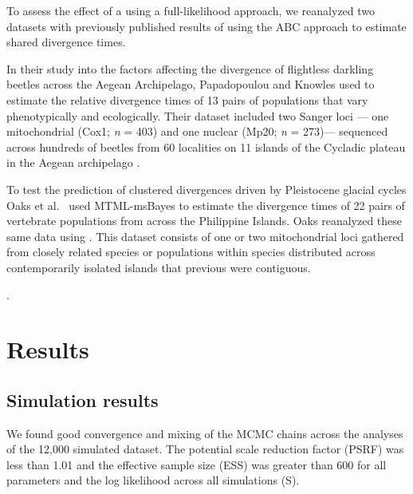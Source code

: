 \documentclass[letterpaper,12pt]{article}
\begin{document}
To assess the effect of a using a full-likelihood approach, we reanalyzed two
datasets with previously published results of using the ABC approach to
estimate shared divergence times.

In their study into the factors affecting the divergence of flightless darkling beetles across the Aegean Archipelago,
Papadopoulou and Knowles \citeyear{PapadopoulouKnowles2015} used \dppmsbayes to estimate the relative divergence times of 13 pairs of populations that vary phenotypically and ecologically.
Their dataset included two Sanger loci --- one mitochondrial (Cox1; \textit{n} = 403) and one nuclear (Mp20; \textit{n} = 273)--- sequenced across hundreds of beetles from 60 localities on 11 islands of the Cycladic plateau in the Aegean archipelago \citep{PapadopoulouKnowles2015}.

To test the prediction of clustered divergences driven by Pleistocene glacial
cycles Oaks et al.\ \citeyear{Oaks2012} used MTML-msBayes \citep{Huang2011} to
estimate the divergence times of 22 pairs of vertebrate populations from across the
Philippine Islands.
Oaks \citeyear{Oaks2014dpp} reanalyzed these same data using \dppmsbayes.
This dataset consists of one or two mitochondrial loci gathered from closely related species or populations within species distributed across contemporarily isolated islands that previous were contiguous.

.


\section{Results}

\subsection{Simulation results}

We found good convergence and mixing of the MCMC chains across the \ecoevolity
analyses of the 12,000 simulated dataset.
The potential scale reduction factor (PSRF) was less than 1.01 and the
effective sample size (ESS) was greater than 600 for all parameters and the log
likelihood across all simulations
(\figs S).
\end{document}
